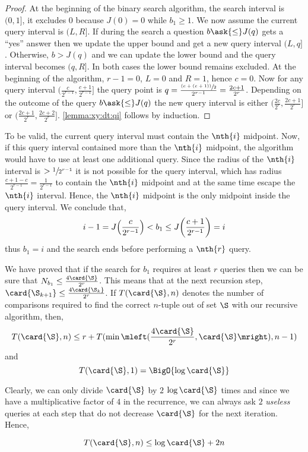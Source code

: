 \begin{proof}
At the beginning of the binary search algorithm, the search interval is
$(0,1]$, it excludes \(0\) because \(J(0) = 0\) while \(b_1 \ge 1\). We now
assume the current query interval is \((L,R]\). If during the search a
question \(b \ask{\le} J(q)\) gets a ``yes'' answer then we update the upper
bound and get a new query interval \((L,q]\). Otherwise, \(b > J(q)\) and we
can update the lower bound and the query interval becomes \((q,R]\). In both
cases the lower bound remains excluded. At the beginning of the algorithm,
\(r - 1 = 0\), \(L=0\) and \(R=1\), hence \(c = 0\). Now for any query
interval $(\frac{c}{2^{r-1}}, \frac{c+1}{2^{r-1}}]$ the query point is \(q =
\frac{\sfrac{(c + (c + 1))}{2}}{2^{r-1}} = \frac{2c + 1}{2^r}\). Depending on the
outcome of the query \(b \ask{\le} J(q)\) the new query interval is
either \((\frac{2c}{2^{r}}, \frac{2c+1}{2^{r}}]\) or \((\frac{2c+1}{2^{r}},
\frac{2c+2}{2^{r}}]\). \ref{lemma:xy:dt:qi} follows by induction.
\end{proof}

To be valid, the current query interval must contain the \(\nth{i}\)
midpoint. Now, if this query interval contained more than the \(\nth{i}\)
midpoint, the algorithm would have to use at least one additional query.
Since the radius of the \(\nth{i}\) interval is \(> \sfrac{1}{2^{r-1}}\) it is
not possible for the query interval, which has radius \( \frac{c+1-c}{2^{r-1}}
 = \frac{1}{2^{r-1}}\) to contain the \(\nth{i}\) midpoint and at
the same time escape the \(\nth{i}\) interval. Hence, the \(\nth{i}\) midpoint
is the only midpoint inside the query interval. We conclude that,
\begin{displaymath}
i-1 = J\mleft(\frac{c}{2^{r-1}}\mright) < b_1 \le J\mleft(\frac{c+1}{2^{r-1}}\mright) = i
\end{displaymath}
thus $b_1 = i$ and the search ends before performing a $\nth{r}$ query.

We have proved that if the search for $b_1$ requires at least $r$ queries then
we can be sure that $N_{b_1} \le \frac{4\card{\S}}{2^r}$. This means that at
the next recursion step, $\card{\S_{k+1}} \le \frac{4\card{\S_k}}{2^r}$. If
$T(\card{\S}, n)$ denotes the number of comparisons required to find the
correct $n$-tuple out of set $\S$ with our recursive algorithm, then,
$$T(\card{\S}, n) \le r + T(\min\mleft(\frac{4\card{\S}}{2^r}, \card{\S}\mright), n-1)$$
and
$$T(\card{\S}, 1) = \BigO{\log \card{\S}}$$

Clearly, we can only divide $\card{\S}$ by $2$ $\log \card{\S}$ times and since
we have a multiplicative factor of $4$ in the recurrence, we can always ask $2$
\emph{useless} queries at each step that do not decrease $\card{\S}$ for the
next iteration. Hence,

\begin{displaymath}
T(\card{\S}, n) \le \log \card{\S} + 2n
\end{displaymath}



